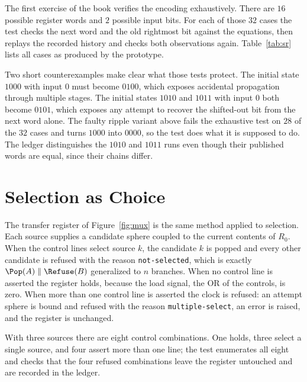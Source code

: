 The first exercise of the book verifies the encoding exhaustively. There are $16$ possible register words and $2$ possible input bits. For each of those $32$ cases the test checks the next word and the old rightmost bit against the equations, then replays the recorded history and checks both observations again. Table~\ref{tab:sr} lists all cases as produced by the prototype.

\begin{table}[ht]
\centering

\caption{All thirty-two transitions of the four-bit shift register, generated by the prototype. The column Out is the old $q_3$.}
\label{tab:sr}
\end{table}

Two short counterexamples make clear what those tests protect. The initial state $1000$ with input $0$ must become $0100$, which exposes accidental propagation through multiple stages. The initial states $1010$ and $1011$ with input $0$ both become $0101$, which exposes any attempt to recover the shifted-out bit from the next word alone. The faulty ripple variant above fails the exhaustive test on $28$ of the $32$ cases and turns $1000$ into $0000$, so the test does what it is supposed to do. The ledger distinguishes the $1010$ and $1011$ runs even though their published words are equal, since their chains differ.

\section{Selection as Choice}

The transfer register of Figure~\ref{fig:mux} is the same method applied to selection. Each source supplies a candidate sphere coupled to the current contents of $R_0$. When the control lines select source $k$, the candidate $k$ is popped and every other candidate is refused with the reason \texttt{not-selected}, which is exactly $\Pop(A)\parallel\Refuse(B)$ generalized to $n$ branches. When no control line is asserted the register holds, because the load signal, the OR of the controls, is zero. When more than one control line is asserted the clock is refused: an attempt sphere is bound and refused with the reason \texttt{multiple-select}, an error is raised, and the register is unchanged.


With three sources there are eight control combinations. One holds, three select a single source, and four assert more than one line; the test enumerates all eight and checks that the four refused combinations leave the register untouched and are recorded in the ledger.

